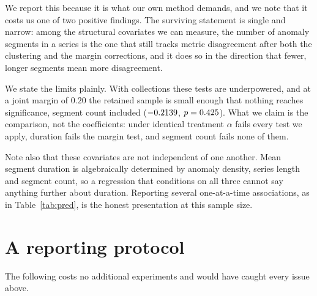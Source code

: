\documentclass[twoside,11pt]{article}
\begin{document}
We report this because it is what our own method demands, and we note that it
costs us one of two positive findings. The surviving statement is single and
narrow: among the structural covariates we can measure, the number of anomaly
segments in a series is the one that still tracks metric disagreement after both
the clustering and the margin corrections, and it does so in the direction that
fewer, longer segments mean more disagreement.

We state the limits plainly. With \TsbadCollections{} collections these tests
are underpowered, and at a joint margin of $0.20$ the retained sample is small
enough that nothing reaches significance, segment count included
($-0.2139{}$, $p = 0.425{}$). What we claim is the
comparison, not the coefficients: under identical treatment $\alpha$ fails every
test we apply, duration fails the margin test, and segment count fails none of
them.

Note also that these covariates are not independent of one another. Mean segment
duration is algebraically determined by anomaly density, series length and
segment count, so a regression that conditions on all three cannot say anything
further about duration. Reporting several one-at-a-time associations, as in
Table~\ref{tab:pred}, is the honest presentation at this sample size.

\section{A reporting protocol}
\label{sec:protocol}

The following costs no additional experiments and would have caught every issue
above.
\end{document}
